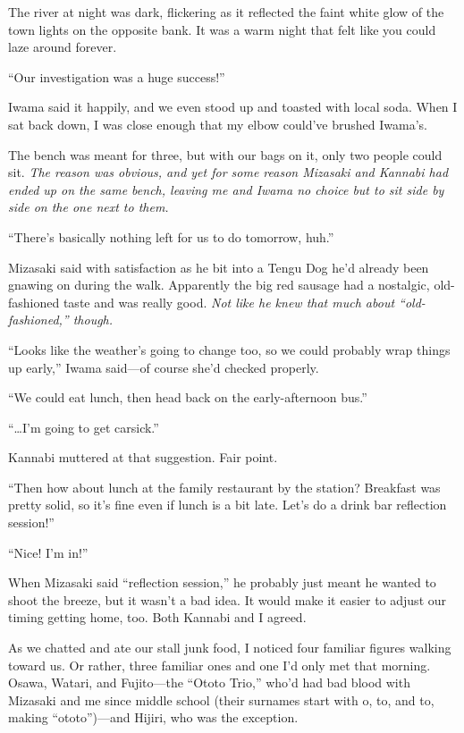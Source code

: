 \documentclass[
    a4paper,
    12pt,
    twoside,
    openany,
    UTF8,
    fontset=windows
]{ctexbook}
\begin{document}
The river at night was dark, flickering as it reflected the faint white glow of the town lights on the opposite bank. It was a warm night that felt like you could laze around forever.

``Our investigation was a huge success!''

Iwama said it happily, and we even stood up and toasted with local soda. When I sat back down, I was close enough that my elbow could've brushed Iwama's.

The bench was meant for three, but with our bags on it, only two people could sit. \textit{The reason was obvious, and yet for some reason Mizasaki and Kannabi had ended up on the same bench, leaving me and Iwama no choice but to sit side by side on the one next to them.}

``There's basically nothing left for us to do tomorrow, huh.''

Mizasaki said with satisfaction as he bit into a Tengu Dog he'd already been gnawing on during the walk. Apparently the big red sausage had a nostalgic, old-fashioned taste and was really good. \textit{Not like he knew that much about ``old-fashioned,'' though.}

``Looks like the weather's going to change too, so we could probably wrap things up early,'' Iwama said---of course she'd checked properly.

``We could eat lunch, then head back on the early-afternoon bus.''

``\dots I'm going to get carsick.''

Kannabi muttered at that suggestion. Fair point.

``Then how about lunch at the family restaurant by the station? Breakfast was pretty solid, so it's fine even if lunch is a bit late. Let's do a drink bar reflection session!''

``Nice! I'm in!''

When Mizasaki said ``reflection session,'' he probably just meant he wanted to shoot the breeze, but it wasn't a bad idea. It would make it easier to adjust our timing getting home, too. Both Kannabi and I agreed.

As we chatted and ate our stall junk food, I noticed four familiar figures walking toward us. Or rather, three familiar ones and one I'd only met that morning. Osawa, Watari, and Fujito---the ``Ototo Trio,'' who'd had bad blood with Mizasaki and me since middle school (their surnames start with o, to, and to, making ``ototo'')---and Hijiri, who was the exception.
\end{document}
